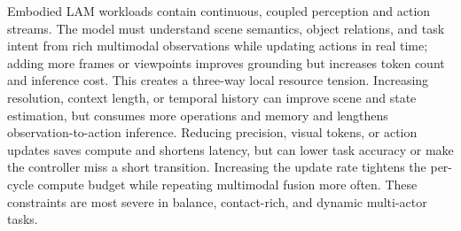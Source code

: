 \documentclass[letterpaper,journal]{IEEEtran}
\begin{document}
Embodied LAM workloads contain continuous, coupled perception and action
streams. The model must understand scene semantics, object relations, and task
intent from rich multimodal observations while updating actions in real time;
adding more frames or viewpoints improves grounding but increases token count
and inference cost. This creates a three-way local resource tension. Increasing
resolution, context length, or temporal history can improve scene and state
estimation, but consumes more operations and memory and lengthens
observation-to-action inference. Reducing precision, visual tokens, or action
updates saves compute and shortens latency, but can lower task accuracy or make
the controller miss a short transition. Increasing the update rate tightens
the per-cycle compute budget while repeating multimodal fusion more often.
These constraints are most severe in balance, contact-rich, and dynamic
multi-actor tasks. 
\end{document}
